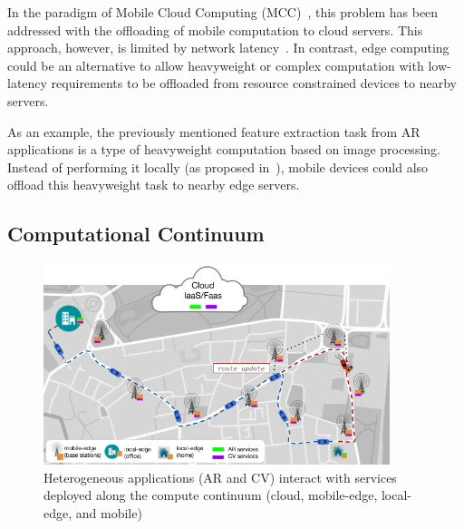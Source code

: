 In the paradigm of Mobile Cloud Computing (MCC)~\cite{Khan:14}, this problem has been addressed with the offloading of mobile computation to cloud servers. This approach, however, is limited by network latency~\cite{Satyanarayanan:2009}. In contrast, edge computing could be an alternative to allow heavyweight or complex computation with low-latency requirements to be offloaded from resource constrained devices to nearby servers.


As an example, the previously mentioned feature extraction task from AR applications is a type of heavyweight computation based on image processing. Instead of performing it locally (as proposed in~\cite{Huang2012}), mobile devices could also offload this heavyweight task to nearby edge servers. 

\subsection{Computational Continuum}


\begin{figure}[tbp]
	\includegraphics[width=0.9\textwidth]{figs/continuum.png}
	\caption{Heterogeneous applications (AR and CV) interact with services deployed along the compute continuum (cloud, mobile-edge, local-edge, and mobile)}
	\label{compute continuumnuum}
\end{figure}

